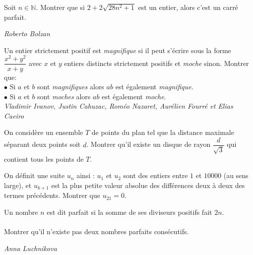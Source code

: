 \begin{exo}{}
Soit $n \in \mathbb{N}$. Montrer que si $2+2\sqrt{28n^2+1}$ est un entier, alors c'est un carré parfait.

\medskip
\textit{Roberto Bolzan}
\end{exo}



\begin{exo}{}
Un entier strictement positif est \textit{magnifique} si il peut s'écrire sous la forme $\dfrac{x^2+y^2}{x+y}$ avec $x$ et $y$ entiers distincts strictement positifs et \textit{moche} sinon. Montrer que:\\
$\bullet$ Si $a$ et $b$ sont \textit{magnifiques} alors $ab$ est également  \textit{magnifique}.\\
$\bullet$ Si $a$ et $b$ sont \textit{moches} alors $ab$ est également \textit{moche}.\\

\medskip
\textit{Vladimir Ivanov, Justin Cahuzac, Roméo Nazaret, Aurélien Fourré et Elias Caeiro}

\end{exo}



\begin{exo}{}
On considère un ensemble $T$ de points du plan tel que la distance maximale séparant deux points soit $d$. Montrer qu'il existe un disque de rayon $\dfrac{d}{\sqrt{3}}$ qui contient tous les points de $T$.
\end{exo}




\begin{exo}{}On définit une suite $u_{n}$ ainsi : $u_{1}$ et $u_{2}$ sont des entiers entre $1$ et $10000$ (au sens large), et $u_{k+1}$
est la plus petite valeur absolue des différences deux à deux des termes précédents. Montrer que
$u_{21} = 0$.

\end{exo}


\begin{exo}{}
Un nombre $n$ est dit parfait si la somme de ses diviseurs positifs fait $2n$.\\~~\\
Montrer qu'il n'existe pas deux nombres parfaits consécutifs.

\medskip
\textit{Anna Luchnikova}

\end{exo}



